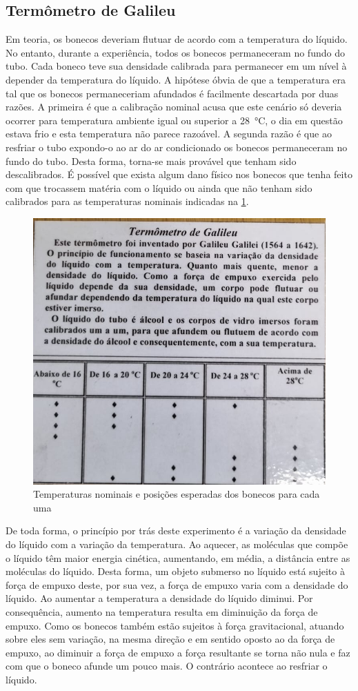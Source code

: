 \subsection{Termômetro de Galileu}

Em teoria, os bonecos deveriam flutuar de acordo com a temperatura do líquido. No entanto, durante a experiência, todos os bonecos permaneceram no fundo do tubo. Cada boneco teve sua densidade calibrada para permanecer em um nível à depender da temperatura do líquido. A hipótese óbvia de que a temperatura era tal que os bonecos permaneceriam afundados é facilmente descartada por duas razões. A primeira é que a calibração nominal acusa que este cenário só deveria ocorrer para temperatura ambiente igual ou superior a \qty{28}{\celsius}, o dia em questão estava frio e esta temperatura não parece razoável. A segunda razão é que ao resfriar o tubo expondo-o ao ar do ar condicionado os bonecos permaneceram no fundo do tubo. Desta forma, torna-se mais provável que tenham sido descalibrados. É possível que exista algum dano físico nos bonecos que tenha feito com que trocassem matéria com o líquido ou ainda que não tenham sido calibrados para as temperaturas nominais indicadas na \cref{temps}.

\begin{figure}[ht]
    \centering
    \includegraphics[width=.5\linewidth]{fig/temps}
    \caption{Temperaturas nominais e posições esperadas dos bonecos para cada uma}\label{temps}
\end{figure}

De toda forma, o princípio por trás deste experimento é a variação da densidade do líquido com a variação da temperatura. Ao aquecer, as moléculas que compõe o líquido têm maior energia cinética, aumentando, em média, a distância entre as moléculas do líquido. Desta forma, um objeto submerso no líquido está sujeito à força de empuxo deste, por sua vez, a força de empuxo varia com a densidade do líquido. Ao aumentar a temperatura a densidade do líquido diminui. Por consequência, aumento na temperatura resulta em diminuição da força de empuxo. Como os bonecos também estão sujeitos à força gravitacional, atuando sobre eles sem variação, na mesma direção e em sentido oposto ao da força de empuxo, ao diminuir a força de empuxo a força resultante se torna não nula e faz com que o boneco afunde um pouco mais. O contrário acontece ao resfriar o líquido. 

